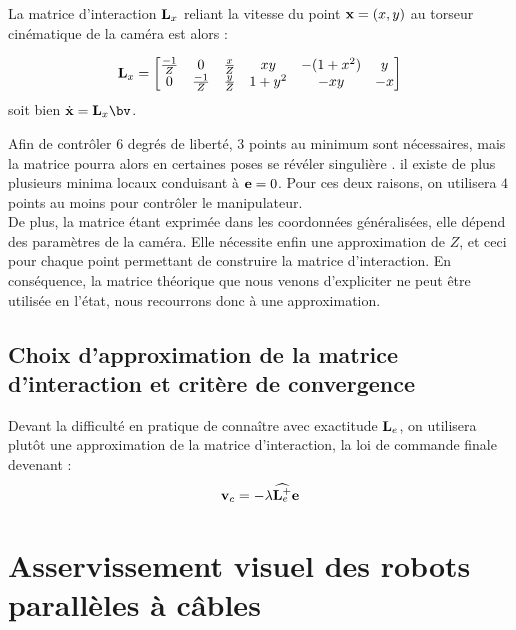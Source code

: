 La matrice d'interaction ${\bf L}_x$ reliant la vitesse du point ${\bf x} = 
(x,y)$ au torseur cin\'ematique de la cam\'era est alors :

\begin{equation}
{\bf L}_x =
\begin{bmatrix}
\frac {-1} Z & 0 & \frac x Z & xy & -(1+x^2) & y \\
0 & \frac {-1} Z & \frac y Z & 1+y^2 & -xy & -x
\end{bmatrix}
\label{chap01:eq22}
\end{equation}
soit bien $\dot {\bf x} = {\bf L}_x \bv$.

Afin de contr\^oler $6$ degr\'es de libert\'e, $3$ points au minimum sont 
n\'ecessaires, mais la matrice pourra alors en certaines poses se r\'ev\'eler 
singuli\`ere \cite{michel1993}. il existe de plus plusieurs minima locaux 
conduisant \`a ${\bf e} = 0$. Pour ces deux raisons, on utilisera $4$ points au 
moins pour contr\^oler le manipulateur.\\

De plus, la matrice \'etant exprim\'ee dans les coordonn\'ees 
g\'en\'eralis\'ees, elle d\'epend des param\`etres de la cam\'era. Elle 
n\'ecessite enfin une approximation de $Z$, et ceci pour chaque point 
permettant de construire la matrice d'interaction. En cons\'equence, la matrice 
th\'eorique que nous venons d'expliciter ne peut \^etre utilis\'ee en l'\'etat, 
nous recourrons donc \`a une approximation.

\subsection{Choix d'approximation de la matrice d'interaction et crit\`ere de
convergence}

Devant la difficult\'e en pratique de connaître avec exactitude ${\bf 
L}_e$, on utilisera plut\^ot une approximation de la matrice d'interaction, la 
loi de commande finale devenant :
\begin{equation}
{\bf v}_c = - \lambda \widehat {{\bf L}_e^+} {\bf e} 
\label{chap01:eq23}
\end{equation}











\section{Asservissement visuel des robots parallèles à 
câbles}\label{chap1-3}

